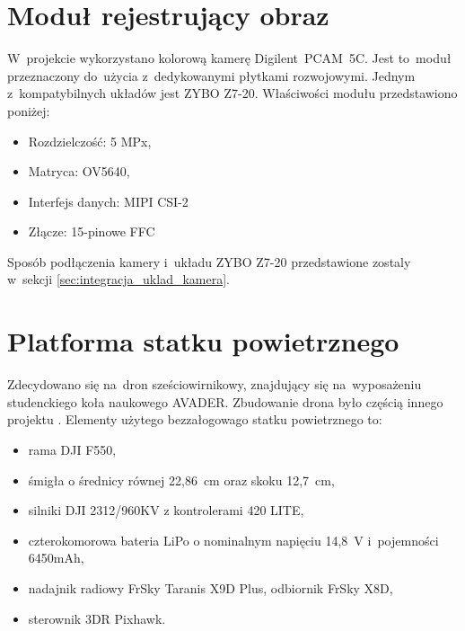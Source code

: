 \section{Moduł rejestrujący obraz}
\label{sec:pcam}
W~projekcie wykorzystano kolorową kamerę Digilent~PCAM~5C. Jest to~moduł przeznaczony do~użycia z~dedykowanymi płytkami rozwojowymi. Jednym z~kompatybilnych układów jest ZYBO Z7-20. Właściwości modułu przedstawiono poniżej:
\begin{itemize}
	\item Rozdzielczość: 5 MPx,
	\item Matryca: OV5640,
	\item Interfejs danych: MIPI CSI-2
	\item Złącze: 15-pinowe FFC
\end{itemize}
Sposób podłączenia kamery i~układu ZYBO Z7-20 przedstawione zostaly w~sekcji \ref{sec:integracja_uklad_kamera}.
\section{Platforma statku powietrznego}
\label{sec:platforma_statku_powietrznego}
Zdecydowano się na~dron sześciowirnikowy, znajdujący się na~wyposażeniu studenckiego koła naukowego AVADER. Zbudowanie drona było częścią innego projektu \cite{mgr}. Elementy użytego bezzałogowago statku powietrznego to:
\begin{itemize}
	\item rama DJI F550,
	\item śmigła o średnicy równej 22,86~cm oraz skoku 12,7~cm,
	\item silniki DJI 2312/960KV z kontrolerami 420 LITE,
	\item czterokomorowa bateria LiPo o nominalnym napięciu 14,8~V i~pojemności 6450mAh, 
	\item nadajnik radiowy FrSky Taranis X9D Plus, odbiornik FrSky X8D,
	\item sterownik 3DR Pixhawk.
\end{itemize}
